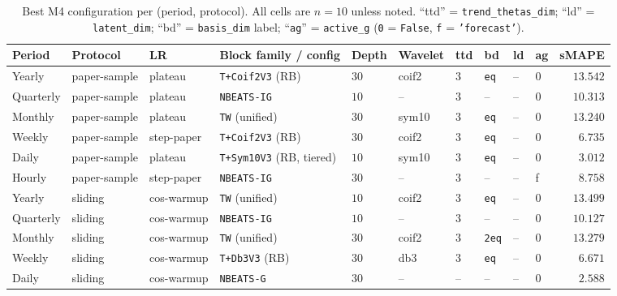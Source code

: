 \documentclass{article}
\begin{document}
\begin{table}[h]
\centering
\scriptsize
\caption{Best M4 configuration per (period, protocol). All cells are $n=10$ unless noted. ``ttd'' = \texttt{trend\_thetas\_dim}; ``ld'' = \texttt{latent\_dim}; ``bd'' = \texttt{basis\_dim} label; ``\texttt{ag}'' = \texttt{active\_g} (\texttt{0} = \texttt{False}, \texttt{f} = \texttt{'forecast'}).}
\label{tab:quickpick}
\begin{tabular}{@{}llllllllllr@{}}
\toprule
Period & Protocol & LR & Block family / config & Depth & Wavelet & ttd & bd & ld & ag & sMAPE \\
\midrule
Yearly    & paper-sample & plateau    & \texttt{T+Coif2V3} (RB)             & $30$ & coif2 & $3$ & \texttt{eq}    & --   & 0 & $13.542$ \\
Quarterly & paper-sample & plateau    & \texttt{NBEATS-IG}                  & $10$ & --    & $3$ & --             & --   & 0 & $10.313$ \\
Monthly   & paper-sample & plateau    & \texttt{TW} (unified)               & $30$ & sym10 & $3$ & \texttt{eq}    & --   & 0 & $13.240$ \\
Weekly    & paper-sample & step-paper & \texttt{T+Coif2V3} (RB)             & $30$ & coif2 & $3$ & \texttt{eq}    & --   & 0 & $\phantom{0}6.735$ \\
Daily     & paper-sample & plateau    & \texttt{T+Sym10V3} (RB, tiered)     & $10$ & sym10 & $3$ & \texttt{eq}    & --   & 0 & $\phantom{0}3.012$ \\
Hourly    & paper-sample & step-paper & \texttt{NBEATS-IG}                  & $30$ & --    & $3$ & --             & --   & f & $\phantom{0}8.758$ \\
\midrule
Yearly    & sliding      & cos-warmup & \texttt{TW} (unified)               & $10$ & coif2 & $3$ & \texttt{eq}    & --   & 0 & $13.499$ \\
Quarterly & sliding      & cos-warmup & \texttt{NBEATS-IG}                  & $10$ & --    & $3$ & --             & --   & 0 & $10.127$ \\
Monthly   & sliding      & cos-warmup & \texttt{TW} (unified)               & $30$ & coif2 & $3$ & \texttt{2eq}   & --   & 0 & $13.279$ \\
Weekly    & sliding      & cos-warmup & \texttt{T+Db3V3} (RB)               & $30$ & db3   & $3$ & \texttt{eq}    & --   & 0 & $\phantom{0}6.671$ \\
Daily     & sliding      & cos-warmup & \texttt{NBEATS-G}                   & $30$ & --    & --  & --             & --   & 0 & $\phantom{0}2.588$ \\

\end{tabular}
\end{table}
\end{document}
